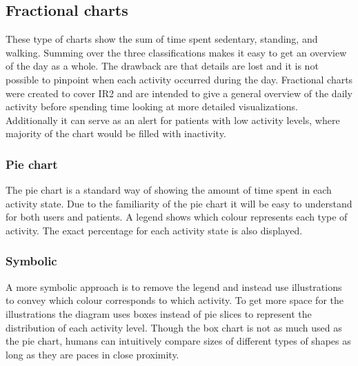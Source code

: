 \subsection{Fractional charts}
These type of charts show the sum of time spent sedentary, standing, and walking. Summing over the three classifications makes it easy to get an overview of the day as a whole. The drawback are that details are lost and it is not possible to pinpoint when each activity occurred during the day. Fractional charts were created to cover IR2 and are intended to give a general overview of the daily activity before spending time looking at more detailed visualizations. Additionally it can serve as an alert for patients with low activity levels, where majority of the chart would be filled with inactivity.

\subsubsection{Pie chart}
The pie chart is a standard way of showing the amount of time spent in each activity state. Due to the familiarity of the pie chart it will be easy to understand for both users and patients. A legend shows which colour represents each type of activity. The exact percentage for each activity state is also displayed.

\subsubsection{Symbolic}
A more symbolic approach is to remove the legend and instead use illustrations to convey which colour corresponds to which activity. To get more space for the illustrations the diagram uses boxes instead of pie slices to represent the distribution of each activity level. Though the box chart is not as much used as the pie chart, humans can intuitively compare sizes of different types of shapes as long as they are paces in close proximity. 


